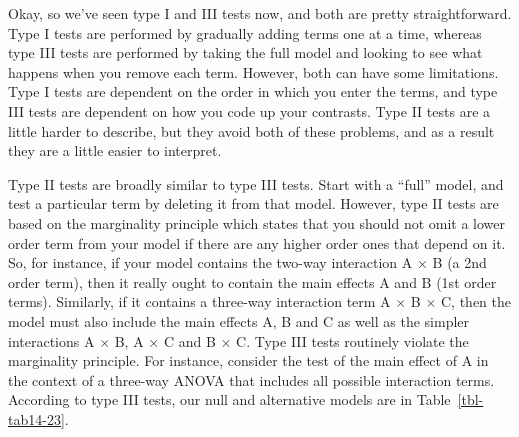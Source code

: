 \documentclass[
  a4paper,
]{book}
\begin{document}
Okay, so we've seen type I and III tests now, and both are pretty
straightforward. Type I tests are performed by gradually adding terms
one at a time, whereas type III tests are performed by taking the full
model and looking to see what happens when you remove each term.
However, both can have some limitations. Type I tests are dependent on
the order in which you enter the terms, and type III tests are dependent
on how you code up your contrasts. Type II tests are a little harder to
describe, but they avoid both of these problems, and as a result they
are a little easier to interpret.

Type II tests are broadly similar to type III tests. Start with a
``full'' model, and test a particular term by deleting it from that
model. However, type II tests are based on the marginality principle
which states that you should not omit a lower order term from your model
if there are any higher order ones that depend on it. So, for instance,
if your model contains the two-way interaction A \(\times\) B (a 2nd
order term), then it really ought to contain the main effects A and B
(1st order terms). Similarly, if it contains a three-way interaction
term A \(\times\) B \(\times\) C, then the model must also include the
main effects A, B and C as well as the simpler interactions A \(\times\)
B, A \(\times\) C and B \(\times\) C. Type III tests routinely violate
the marginality principle. For instance, consider the test of the main
effect of A in the context of a three-way ANOVA that includes all
possible interaction terms. According to type III tests, our null and
alternative models are in Table~\ref{tbl-tab14-23}.

\hypertarget{tbl-tab14-23}{}
 
  \providecommand{\huxb}[2]{\arrayrulecolor[RGB]{#1}\global\arrayrulewidth=#2pt}
  \providecommand{\huxvb}[2]{\color[RGB]{#1}\vrule width #2pt}
  \providecommand{\huxtpad}[1]{\rule{0pt}{#1}}
  \providecommand{\huxbpad}[1]{\rule[-#1]{0pt}{#1}}
\end{document}
